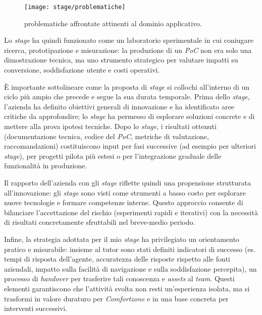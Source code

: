 \begin{figure}[htbp]
  \centering
  \texttt{[image: stage/problematiche]}
  \caption{problematiche affrontate attinenti al dominio applicativo.}
  \label{fig:problematiche}
\end{figure}
 
Lo \emph{stage} ha quindi funzionato come un laboratorio sperimentale in cui coniugare ricerca, prototipazione e misurazione: la produzione di un \emph{PoC} non era solo una dimostrazione tecnica, 
ma uno strumento strategico per valutare impatti su conversione, soddisfazione utente e costi operativi.

È importante sottolineare come la proposta di \emph{stage} si collochi all'interno di un ciclo più ampio che precede e segue la sua durata temporale. Prima dello \emph{stage}, 
l'azienda ha definito obiettivi generali di innovazione e ha identificato aree critiche da approfondire; lo \emph{stage} ha permesso di esplorare soluzioni concrete e di mettere 
alla prova ipotesi tecniche. Dopo lo \emph{stage}, i risultati ottenuti (documentazione tecnica, codice del \emph{PoC}, metriche di valutazione, raccomandazioni) 
costituiscono input per fasi successive (ad esempio per ulteriori \emph{stage}), per progetti pilota più estesi o per l'integrazione graduale delle funzionalità in produzione.

Il rapporto dell'azienda con gli \emph{stage} riflette quindi una propensione strutturata all'innovazione: gli \emph{stage} sono visti come strumenti a basso costo per esplorare nuove tecnologie e
formare competenze interne. Questo approccio consente di bilanciare l'accettazione del rischio (esperimenti rapidi e iterativi) 
con la necessità di risultati concretamente sfruttabili nel breve-medio periodo.

Infine, la strategia adottata per il mio \emph{stage} ha privilegiato un orientamento pratico e misurabile: insieme al tutor sono stati definiti indicatori di successo 
(es. tempi di risposta dell'agente, accuratezza delle risposte rispetto alle fonti aziendali, impatto sulla facilità di navigazione e sulla soddisfazione percepita), 
un processo di \emph{handover} per trasferire tali conoscenza e \emph{assets} al \emph{team}. Questi elementi garantiscono che l'attività svolta non resti 
un'esperienza isolata, ma si trasformi in valore duraturo per \emph{Comfortzone} e in una base concreta per interventi successivi.











